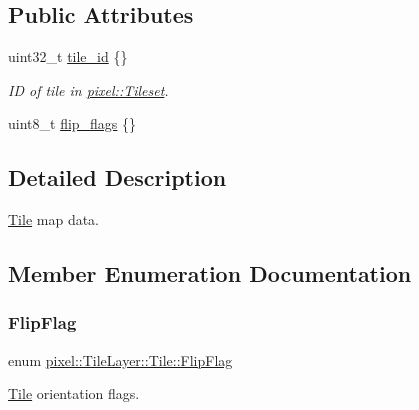 \subsection*{Public Attributes}
\begin{DoxyCompactItemize}
\item 
uint32\+\_\+t \hyperlink{structpixel_1_1_tile_layer_1_1_tile_a5f4c70323cd0793bd2cbe0c23247de56}{tile\+\_\+id} \{\}
\begin{DoxyCompactList}\small\item\em ID of tile in \hyperlink{classpixel_1_1_tileset}{pixel\+::\+Tileset}. \end{DoxyCompactList}\item 
uint8\+\_\+t \hyperlink{structpixel_1_1_tile_layer_1_1_tile_a69642d11eccac2819b3b56dc07859f63}{flip\+\_\+flags} \{\}
\end{DoxyCompactItemize}


\subsection{Detailed Description}
\hyperlink{structpixel_1_1_tile_layer_1_1_tile}{Tile} map data. 

\subsection{Member Enumeration Documentation}
\mbox{\label{structpixel_1_1_tile_layer_1_1_tile_a0e91c99da154ec494bb4a4bfd719cecb}} 
\subsubsection{\texorpdfstring{Flip\+Flag}{FlipFlag}}
{\footnotesize\ttfamily enum \hyperlink{structpixel_1_1_tile_layer_1_1_tile_a0e91c99da154ec494bb4a4bfd719cecb}{pixel\+::\+Tile\+Layer\+::\+Tile\+::\+Flip\+Flag}}



\hyperlink{structpixel_1_1_tile_layer_1_1_tile}{Tile} orientation flags. 

